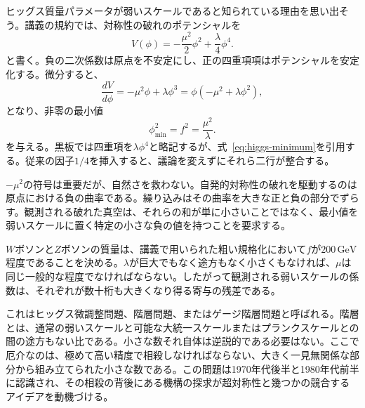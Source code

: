 \begin{classroomqa}
\end{classroomqa}

ヒッグス質量パラメータが弱いスケールであると知られている理由を思い出そう。講義の規約では、対称性の破れのポテンシャルを
\begin{equation}
V(\phi)=-\frac{\mu^2}{2}\phi^2+\frac{\lambda}{4}\phi^4.
\label{eq:higgs-potential}
\end{equation}
と書く。負の二次係数は原点を不安定にし、正の四重項項はポテンシャルを安定化する。微分すると、
\begin{equation}
\frac{dV}{d\phi}=-\mu^2\phi+\lambda\phi^3
=\phi(-\mu^2+\lambda\phi^2),
\end{equation}
となり、非零の最小値
\begin{equation}
\phi_{\min}^2=f^2=\frac{\mu^2}{\lambda}.
\label{eq:higgs-minimum}
\end{equation}
を与える。黒板では四重項を\(\lambda\phi^4\)と略記するが、式~\eqref{eq:higgs-minimum}を引用する。従来の因子\(1/4\)を挿入すると、議論を変えずにそれら二行が整合する。

\(-\mu^2\)の符号は重要だが、自然さを救わない。自発的対称性の破れを駆動するのは原点における負の曲率である。繰り込みはその曲率を大きな正と負の部分でずらす。観測される破れた真空は、それらの和が単に小さいことではなく、最小値を弱いスケールに置く特定の小さな負の値を持つことを要求する。

\(W\)ボソンと\(Z\)ボソンの質量は、講義で用いられた粗い規格化において\(f\)が\(200\,\mathrm{GeV}\)程度であることを決める。\(\lambda\)が巨大でもなく途方もなく小さくもなければ、\(\mu\)は同じ一般的な程度でなければならない。したがって観測される弱いスケールの係数は、それぞれが数十桁も大きくなり得る寄与の残差である。

これはヒッグス微調整問題、階層問題、またはゲージ階層問題と呼ばれる。階層とは、通常の弱いスケールと可能な大統一スケールまたはプランクスケールとの間の途方もない比である。小さな数それ自体は逆説的である必要はない。ここで厄介なのは、極めて高い精度で相殺しなければならない、大きく一見無関係な部分から組み立てられた小さな数である。この問題は1970年代後半と1980年代前半に認識され、その相殺の背後にある機構の探求が超対称性と幾つかの競合するアイデアを動機づける。


